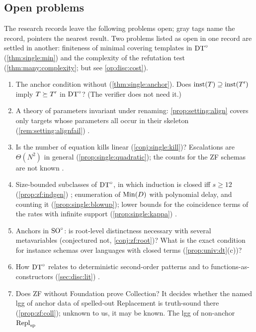 \subsection{Open problems}\label{sec:disc:open}

The research records leave the following problems open; gray tags name the record, pointers the nearest result. Two
problems listed as open in one record are settled in another: finiteness of minimal covering templates in $\mathrm{DT}^{\circ}$
(\cref{thm:single:min}) and the complexity of the refutation test (\cref{thm:many:complexity}; but see
\ref{op:disc:cost}).
\begin{enumerate}[label=O\arabic*,ref=O\arabic*,leftmargin=*,itemsep=0pt,topsep=3pt]
\item The anchor condition without \Rich{} (\cref{thm:single:anchor}). Does $\mathrm{inst}(T)\supseteq\mathrm{inst}(T')$ imply
$T\succeq T'$ in $\mathrm{DT}^{\circ}$? (The verifier does not need it.) 
\item A theory of parameters invariant under renaming: \cref{prop:setting:align} covers only targets whose parameters
all occur in their skeleton (\cref{rem:setting:alignfail}) .
\item Is the number of equation kills linear (\cref{conj:single:kill})? Escalations are $\Theta(N^2)$ in general
(\cref{prop:single:quadratic}); the counts for the ZF schemas are not known .
\item Size-bounded subclasses of $\mathrm{DT}^{\circ}$, in which induction is closed iff $s\ge12$ (\cref{prop:zf:indgen})
; enumeration of $\mathrm{Min}(D)$ with polynomial delay, and counting it
(\cref{prop:single:blowup}); lower bounds for the coincidence terms of the rates with infinite support
(\cref{prop:single:kappa}) .
\item Anchors in $\mathrm{SO}^{\circ}$: is root-level distinctness necessary with several metavariables (conjectured not,
\cref{conj:zf:root})? What is the exact condition for instance schemas over languages with closed terms
(\cref{prop:univ:dt}(c))? 
\item How $\mathrm{DT}^{\circ}$ relates to deterministic second-order patterns and to functions-as-constructors
(\cref{sec:disc:lit}) .
\item Does ZF without Foundation prove Collection? It decides whether the named lgg of anchor data of spelled-out
Replacement is truth-sound there (\cref{prop:zf:coll}); unknown to us, it may be known. The lgg of non-anchor $\mathrm{Repl}_{\mathrm{sp}}$

\end{enumerate}
